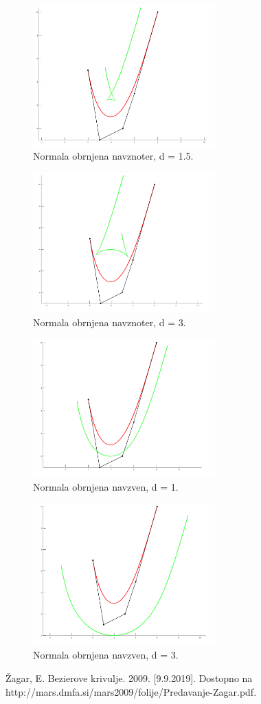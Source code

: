 \documentclass{article}
\begin{document}
 \begin{figure}[!ht]
\centering
       \includegraphics[width=70mm]{odmik2.png}
	\caption{Normala obrnjena navznoter, d = 1.5.}
\end{figure}

 \begin{figure}[!ht]
\centering
       \includegraphics[width=70mm]{odmik3.png}
		\caption{Normala obrnjena navznoter, d = 3.}
\end{figure}

\newpage

 \begin{figure}[!ht]
\centering
       \includegraphics[width=70mm]{odmik4.png}
		\caption{Normala obrnjena navzven, d = 1.}
\end{figure}

 \begin{figure}[!ht]
\centering
       \includegraphics[width=70mm]{odmik5.png}
		\caption{Normala obrnjena navzven, d = 3.}
\end{figure}


\newpage
\begin{thebibliography}{9}

\bibitem{}
Žagar, E. Bezierove krivulje. 2009. [9.9.2019]. Dostopno na http://mars.dmfa.si/mars2009/folije/Predavanje-Zagar.pdf.


\end{thebibliography}
\end{document}
